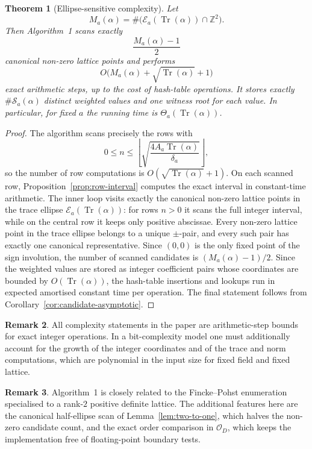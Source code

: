 \documentclass[manuscript]{acmart}
\theoremstyle{plain}
\newtheorem{theorem}{Theorem}[section]
\theoremstyle{definition}
\theoremstyle{nonitalicremark}
\newtheorem{remark}[theorem]{Remark}
\newcommand{\Z}{\mathbb{Z}}
\newcommand{\OO}{\mathcal{O}}
\newcommand{\OD}{\OO_D}
\newcommand{\Tr}{\operatorname{Tr}}
\newcommand{\cE}{\mathcal{E}}
\newcommand{\cS}{\mathcal{S}}
\begin{document}
\begin{theorem}[Ellipse-sensitive complexity]\label{thm:candidate-sensitive}
Let
\[
M_a(\alpha)=\#\bigl(\cE_a(\Tr(\alpha))\cap\Z^2\bigr).
\]
Then Algorithm~1 scans exactly
\[
\frac{M_a(\alpha)-1}{2}
\]
canonical non-zero lattice points and performs
\[
O\bigl(M_a(\alpha)+\sqrt{\Tr(\alpha)}+1\bigr)
\]
exact arithmetic steps, up to the cost of hash-table operations. It stores exactly $\#\cS_a(\alpha)$
distinct weighted values and one witness root for each value. In particular, for fixed $a$ the
running time is $\Theta_a(\Tr(\alpha))$.
\end{theorem}

\begin{proof}
The algorithm scans precisely the rows with
\[
0\le n\le \left\lfloor \sqrt{\frac{4A_a\Tr(\alpha)}{\delta_a}}\right\rfloor,
\]
so the number of row computations is $O(\sqrt{\Tr(\alpha)}+1)$. On each scanned row,
Proposition~\ref{prop:row-interval} computes the exact interval in constant-time arithmetic. The
inner loop visits exactly the canonical non-zero lattice points in the trace ellipse
$\cE_a(\Tr(\alpha))$: for rows $n>0$ it scans the full integer interval, while on the central row it
keeps only positive abscissae. Every non-zero lattice point in the trace ellipse belongs to a unique
$\pm$-pair, and every such pair has exactly one canonical representative. Since $(0,0)$ is the only
fixed point of the sign involution, the number of scanned candidates is $(M_a(\alpha)-1)/2$.
Since the weighted values are stored as integer coefficient pairs whose coordinates are bounded by
$O(\Tr(\alpha))$, the hash-table insertions and lookups run in expected amortised constant time per
operation. The final statement follows from Corollary~\ref{cor:candidate-asymptotic}.
\end{proof}

\begin{remark}
All complexity statements in the paper are arithmetic-step bounds for exact integer operations. In a bit-complexity model one must additionally account for the growth of the integer coordinates and of the trace and norm computations, which are polynomial in the input size for fixed field and fixed lattice.
\end{remark}

\begin{remark}
Algorithm~1 is closely related to the Fincke--Pohst enumeration \cite{FinckePohst} specialised to a
rank-$2$ positive definite lattice. The additional features here are the canonical half-ellipse scan
of Lemma~\ref{lem:two-to-one}, which halves the non-zero candidate count, and the exact order
comparison in $\OD$, which keeps the implementation free of floating-point boundary tests.
\end{remark}
\end{document}
